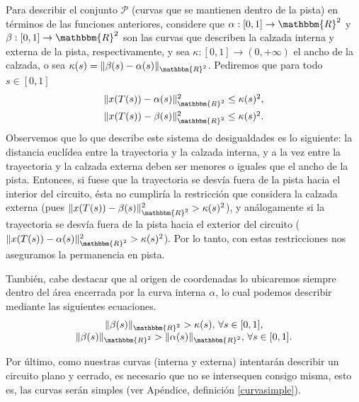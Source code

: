 \documentclass[a4paper,10pt]{book}
\newcommand{\R}{\mathbbm{R}}
\newcommand{\arr}{\rightarrow}
\begin{document}
Para describir el conjunto $\mathcal{P}$ (curvas que se mantienen dentro de la pista) en t\'erminos de las funciones anteriores, considere que $\alpha:[0,1]\arr\R^2$ y $\beta:[0,1]\arr\R^2$ son las curvas que describen la calzada interna y externa de la pista, respectivamente, y sea $\kappa:[0,1]\arr(0,+\infty)$ el ancho de la calzada, o sea $\kappa(s)=\|\beta(s)-\alpha(s)\|_{\R^2}$. Pediremos que para todo $s\in[0,1]$
\begin{equation}\label{pista2}
\begin{array}{c}
 \|x(T(s))-\alpha(s)\|_{\R^2}^2 \leq \kappa(s)^2,\\[2mm]
 \|x(T(s))-\beta(s)\|_{\R^2}^2 \leq \kappa(s)^2.
\end{array}
\end{equation}
Observemos que lo que describe este sistema de desigualdades es lo siguiente: la distancia euclídea entre la trayectoria y la calzada interna, y a la vez entre la trayectoria y la calzada externa deben ser menores o iguales que el ancho de la pista. Entonces, si fuese que la trayectoria se desvía fuera de la pista hacia el interior del circuito, \'esta no cumpliría la restricción que considera la calzada externa (pues $\|x(T(s))-\beta(s)\|_{\R^2}^2 > \kappa(s)^2$), y análogamente si la trayectoria se desvía fuera de la pista hacia el exterior del circuito ($\|x(T(s))-\alpha(s)\|_{\R^2}^2 > \kappa(s)^2$).
Por lo tanto, con estas restricciones nos aseguramos la permanencia en pista.

También, cabe destacar que al origen de coordenadas lo ubicaremos siempre dentro del área encerrada por la curva interna $\alpha$, lo cual podemos describir mediante las siguientes ecuaciones.
\begin{equation*}
    \begin{array}{c}
         \|\beta(s)\|_{\R^2}>\kappa(s),\,\forall s\in[0,1],\\
         \|\beta(s)\|_{\R^2}>\|\alpha(s)\|_{\R^2},\,\forall s\in[0,1].
    \end{array}
\end{equation*}

Por último, como nuestras curvas (interna y externa) intentarán describir un circuito plano y cerrado, es necesario que no se intersequen consigo misma, esto es, las curvas serán simples (ver Apéndice, definición \eqref{curvasimple}).
\end{document}

